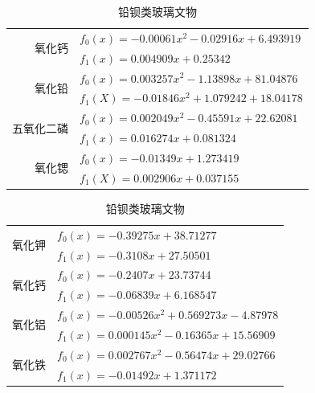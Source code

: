 \documentclass[withoutpreface,bwprint]{cumcmthesis}
\begin{document}
\begin{table}[H]
	\centering
	\caption{铅钡类玻璃文物}
	  \begin{tabular}{rl}
	  \toprule
	  \multicolumn{1}{r}{\multirow{2}[4]{*}{氧化钙}} & $f_0(x)=-0.00061x^2-0.02916x+6.493919$\\
  \cmidrule{2-2}          & $f_1(x)=0.004909x+0.25342$\\
	  \midrule
	  \multicolumn{1}{r}{\multirow{2}[4]{*}{氧化铅}} & $f_0(x)=0.003257x^2-1.13898x+81.04876$\\
  \cmidrule{2-2}          & $f_1(X)=-0.01846x^2+1.079242+18.04178$\\
	  \midrule
	  \multicolumn{1}{r}{\multirow{2}[4]{*}{五氧化二磷}} & $f_0(x)=0.002049x^2-0.45591x+22.62081$ \\
  \cmidrule{2-2}          & $f_1(x)=0.016274x+0.081324$\\
	  \midrule
	  \multicolumn{1}{r}{\multirow{2}[4]{*}{氧化锶}} & $f_0(x)=-0.01349x+1.273419$\\
  \cmidrule{2-2}          & $f_1(X)=0.002906x+0.037155$\\
	  \bottomrule
	  \end{tabular}%
	\label{tab:铅钡类玻璃文物}%
  \end{table}%

\begin{table}[H]
	\centering
	\caption{铅钡类玻璃文物}
	  \begin{tabular}{rl}
	  \toprule
	  \multicolumn{1}{r}{\multirow{2}[4]{*}{氧化钾}} & $f_0(x)=-0.39275x+38.71277$ \\
  \cmidrule{2-2}          & $f_1(x)=-0.3108x+27.50501$ \\
	  \midrule
	  \multicolumn{1}{r}{\multirow{2}[4]{*}{氧化钙}} & $f_0(x)=-0.2407x+23.73744$ \\
  \cmidrule{2-2}          & $f_1(x)=-0.06839x+6.168547$ \\
	  \midrule
	  \multicolumn{1}{r}{\multirow{2}[4]{*}{氧化铝}} & $f_0(x)=-0.00526x^2+0.569273x-4.87978$ \\
  \cmidrule{2-2}          & $f_1(x)=0.000145x^2-0.16365x+15.56909$ \\
	  \midrule
	  \multicolumn{1}{r}{\multirow{2}[4]{*}{氧化铁}} & $f_0(x)=0.002767x^2-0.56474x+29.02766$ \\
  \cmidrule{2-2}          & $f_1(x)=-0.01492x+1.371172$ \\
	  \bottomrule
	  \end{tabular}%
	\label{tab:铅钡类玻璃文物}%
  \end{table}%
  
\end{document}
